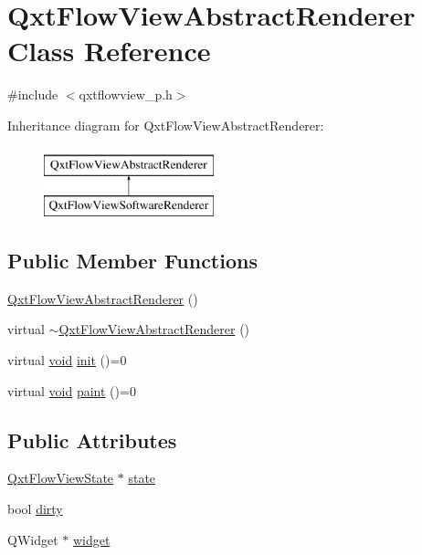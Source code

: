 \hypertarget{class_qxt_flow_view_abstract_renderer}{\section{Qxt\-Flow\-View\-Abstract\-Renderer Class Reference}
\label{class_qxt_flow_view_abstract_renderer}
}


{\ttfamily \#include $<$qxtflowview\-\_\-p.\-h$>$}

Inheritance diagram for Qxt\-Flow\-View\-Abstract\-Renderer\-:\begin{figure}[H]
\begin{center}
\leavevmode
\includegraphics[height=2.000000cm]{class_qxt_flow_view_abstract_renderer}
\end{center}
\end{figure}
\subsection*{Public Member Functions}
\begin{DoxyCompactItemize}
\item 
\hyperlink{class_qxt_flow_view_abstract_renderer_a34216bb9dd6cf58f6426c30873d851e6}{Qxt\-Flow\-View\-Abstract\-Renderer} ()
\item 
virtual \hyperlink{class_qxt_flow_view_abstract_renderer_a9a8e02bb61cffcb79dbbd53094b12625}{$\sim$\-Qxt\-Flow\-View\-Abstract\-Renderer} ()
\item 
virtual \hyperlink{group___u_a_v_objects_plugin_ga444cf2ff3f0ecbe028adce838d373f5c}{void} \hyperlink{class_qxt_flow_view_abstract_renderer_aac373e843f42dea8918b51e06ff1bea4}{init} ()=0
\item 
virtual \hyperlink{group___u_a_v_objects_plugin_ga444cf2ff3f0ecbe028adce838d373f5c}{void} \hyperlink{class_qxt_flow_view_abstract_renderer_a0cfdcbb9d5f2d1133719afb25671ffe3}{paint} ()=0
\end{DoxyCompactItemize}
\subsection*{Public Attributes}
\begin{DoxyCompactItemize}
\item 
\hyperlink{class_qxt_flow_view_state}{Qxt\-Flow\-View\-State} $\ast$ \hyperlink{class_qxt_flow_view_abstract_renderer_a094144abd273a72fae63aea927ee5c57}{state}
\item 
bool \hyperlink{class_qxt_flow_view_abstract_renderer_a923efcf33a6120a32a2ed93ec6667b3b}{dirty}
\item 
Q\-Widget $\ast$ \hyperlink{class_qxt_flow_view_abstract_renderer_a9b3903131dd2d9efa8e3f3967dd12088}{widget}
\end{DoxyCompactItemize}



